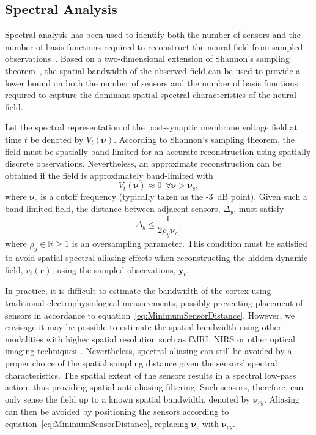 \documentclass[12pt]{iopart}
\begin{document}
\subsection{Spectral Analysis}\label{SpectralAnalysisSection} 
Spectral analysis has been used to identify both the number of sensors and the number of basis functions required to reconstruct the neural field from sampled observations~\cite{Sanner1992,Scerri2009}. Based on a two-dimensional extension of Shannon's sampling theorem~\cite{Peterson1962}, the spatial bandwidth of the observed field can be used to provide a lower bound on both the number of sensors and the number of basis functions required to capture the dominant spatial spectral characteristics of the neural field.

Let the spectral representation of the post-synaptic membrane voltage field at time $t$ be denoted by $V_t(\boldsymbol{\nu})$. According to Shannon's sampling theorem, the field must be spatially band-limited for an accurate reconstruction using spatially discrete observations. Nevertheless, an approximate reconstruction can be obtained if the field is approximately band-limited with 
\begin{equation}
	V_t(\boldsymbol{\nu}) \approx 0 ~ \ \forall \boldsymbol{\nu} > \boldsymbol{\nu}_c,
\end{equation}
where $\boldsymbol{\nu}_c$ is a cutoff frequency (typically taken as the -3~dB point). Given such a band-limited field, the distance between adjacent sensors, $\Delta_y$, must satisfy 
\begin{equation}
	\label{eq:MinimumSensorDistance} \Delta_y \leq \frac{1}{2\rho_y\boldsymbol{\nu}_{c}}, 
\end{equation}
where $\rho_y \in \mathbb{R} \ge 1$ is an oversampling parameter. This condition must be satisfied to avoid spatial spectral aliasing effects when reconstructing the hidden dynamic field, $v_t(\mathbf{r})$, using the sampled observations, $\mathbf{y}_t$.

In practice, it is difficult to estimate the bandwidth of the cortex using traditional electrophysiological measurements, possibly preventing placement of sensors in accordance to equation~\ref{eq:MinimumSensorDistance}. However, we envisage it may be possible to estimate the spatial bandwidth using other modalities with higher spatial resolution such as fMRI, NIRS or other optical imaging techniques~\cite{Issa2000}. Nevertheless, spectral aliasing can still be avoided by a proper choice of the spatial sampling distance given the sensors' spectral characteristics. The spatial extent of the sensors results in a spectral low-pass action, thus providing spatial anti-aliasing filtering. Such sensors, therefore, can only sense the field up to a known spatial bandwidth, denoted by $\boldsymbol{\nu}_{cy}$. Aliasing can then be avoided by positioning the sensors according to equation~\ref{eq:MinimumSensorDistance}, replacing $\boldsymbol{\nu}_c$ with $\boldsymbol{\nu}_{cy}$.
\end{document}

